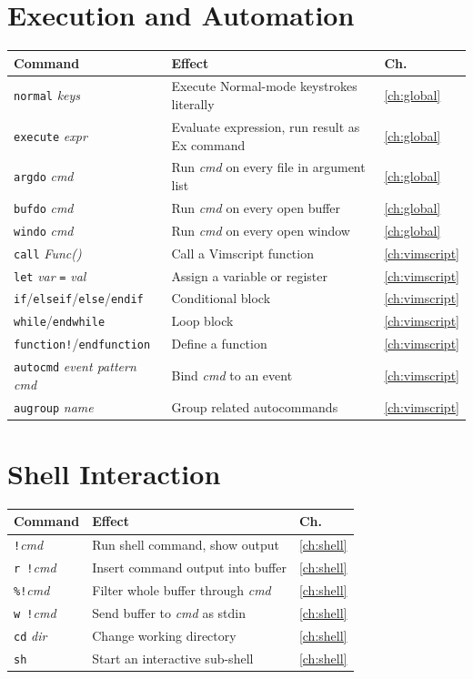 \section{Execution and Automation}

\begin{longtable}{@{}l p{9cm} l@{}}
\textbf{Command} & \textbf{Effect} & \textbf{Ch.} \\
\hline
\endhead
\texttt{normal} \textit{keys} & Execute Normal-mode keystrokes literally & \ref{ch:global} \\
\texttt{execute} \textit{expr} & Evaluate expression, run result as Ex command & \ref{ch:global} \\
\texttt{argdo} \textit{cmd} & Run \textit{cmd} on every file in argument list & \ref{ch:global} \\
\texttt{bufdo} \textit{cmd} & Run \textit{cmd} on every open buffer & \ref{ch:global} \\
\texttt{windo} \textit{cmd} & Run \textit{cmd} on every open window & \ref{ch:global} \\
\texttt{call} \textit{Func()} & Call a Vimscript function & \ref{ch:vimscript} \\
\texttt{let} \textit{var} \texttt{=} \textit{val} & Assign a variable or register & \ref{ch:vimscript} \\
\texttt{if}/\texttt{elseif}/\texttt{else}/\texttt{endif} & Conditional block & \ref{ch:vimscript} \\
\texttt{while}/\texttt{endwhile} & Loop block & \ref{ch:vimscript} \\
\texttt{function!}/\texttt{endfunction} & Define a function & \ref{ch:vimscript} \\
\texttt{autocmd} \textit{event pattern cmd} & Bind \textit{cmd} to an event & \ref{ch:vimscript} \\
\texttt{augroup} \textit{name} & Group related autocommands & \ref{ch:vimscript} \\
\end{longtable}

\section{Shell Interaction}

\begin{longtable}{@{}l p{9cm} l@{}}
\textbf{Command} & \textbf{Effect} & \textbf{Ch.} \\
\hline
\endhead
\texttt{!}\textit{cmd} & Run shell command, show output & \ref{ch:shell} \\
\texttt{r !}\textit{cmd} & Insert command output into buffer & \ref{ch:shell} \\
\texttt{\%!}\textit{cmd} & Filter whole buffer through \textit{cmd} & \ref{ch:shell} \\
\texttt{w !}\textit{cmd} & Send buffer to \textit{cmd} as stdin & \ref{ch:shell} \\
\texttt{cd} \textit{dir} & Change working directory & \ref{ch:shell} \\
\texttt{sh} & Start an interactive sub-shell & \ref{ch:shell} \\
\end{longtable}

